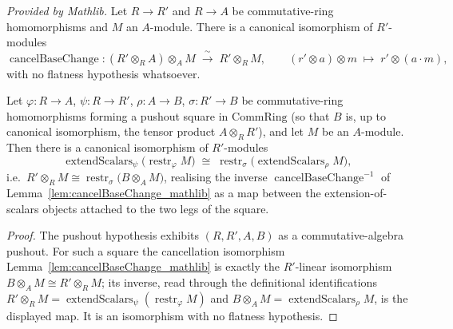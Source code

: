 \begin{lemma}
  \label{lem:cancelBaseChange_mathlib}
  \mathlibok
  \textit{Provided by Mathlib.}
  Let \(R \to R'\) and \(R \to A\) be commutative-ring homomorphisms and \(M\) an
  \(A\)-module. There is a canonical isomorphism of \(R'\)-modules
  \[
    \operatorname{cancelBaseChange} :
    (R' \otimes_R A) \otimes_A M \;\xrightarrow{\ \sim\ }\; R' \otimes_R M,
    \qquad (r' \otimes a) \otimes m \;\mapsto\; r' \otimes (a \cdot m),
  \]
  with no flatness hypothesis whatsoever.
\end{lemma}

\begin{lemma}
  \label{lem:baseChangeCancelModuleIso}
  Let \(\varphi : R \to A\), \(\psi : R \to R'\), \(\rho : A \to B\),
  \(\sigma : R' \to B\) be commutative-ring homomorphisms forming a pushout square in
  \(\mathrm{CommRing}\) (so that \(B\) is, up to canonical isomorphism, the tensor
  product \(A \otimes_R R'\)), and let \(M\) be an \(A\)-module. Then there is a
  canonical isomorphism of \(R'\)-modules
  \[
    \operatorname{extendScalars}_\psi\bigl(\operatorname{restr}_\varphi M\bigr)
    \;\cong\;
    \operatorname{restr}_\sigma\bigl(\operatorname{extendScalars}_\rho M\bigr),
  \]
  i.e.\ \(R' \otimes_R M \cong \operatorname{restr}_\sigma\bigl(B \otimes_A M\bigr)\),
  realising the inverse \(\operatorname{cancelBaseChange}^{-1}\) of
  Lemma~\ref{lem:cancelBaseChange_mathlib} as a map between the extension-of-scalars
  objects attached to the two legs of the square.
\end{lemma}

\begin{proof}
  \leanok
  The pushout hypothesis exhibits \((R, R', A, B)\) as a commutative-algebra pushout.
  For such a square the cancellation isomorphism Lemma~\ref{lem:cancelBaseChange_mathlib} is
  exactly the \(R'\)-linear isomorphism \(B \otimes_A M \cong R' \otimes_R M\); its
  inverse, read through the definitional identifications
  \(R' \otimes_R M = \operatorname{extendScalars}_\psi(\operatorname{restr}_\varphi M)\)
  and \(B \otimes_A M = \operatorname{extendScalars}_\rho M\), is the displayed map. It
  is an isomorphism with no flatness hypothesis.
\end{proof}

